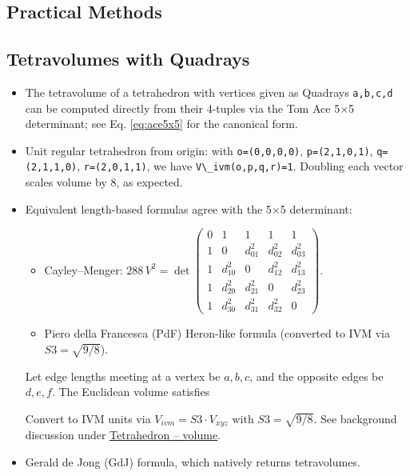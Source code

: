 \documentclass[
  10pt,
]{article}
\newcommand{\passthrough}[1]{#1}
\providecommand{\tightlist}{%
  \setlength{\itemsep}{0pt}\setlength{\parskip}{0pt}}
\begin{document}
\hypertarget{practical-methods}{%
\subsection{Practical Methods}\label{practical-methods}}

\hypertarget{sec:tetravolumes_quadrays}{%
\subsection{Tetravolumes with
Quadrays}\label{sec:tetravolumes_quadrays}}

\begin{itemize}
\item
  The tetravolume of a tetrahedron with vertices given as Quadrays
  \passthrough{\lstinline!a,b,c,d!} can be computed directly from their
  4-tuples via the Tom Ace 5×5 determinant; see Eq. \eqref{eq:ace5x5}
  for the canonical form.
\item
  Unit regular tetrahedron from origin: with
  \passthrough{\lstinline!o=(0,0,0,0)!},
  \passthrough{\lstinline!p=(2,1,0,1)!},
  \passthrough{\lstinline!q=(2,1,1,0)!},
  \passthrough{\lstinline!r=(2,0,1,1)!}, we have
  \passthrough{\lstinline!V\_ivm(o,p,q,r)=1!}. Doubling each vector
  scales volume by 8, as expected.
\item
  Equivalent length-based formulas agree with the 5×5 determinant:

  \begin{itemize}
  \tightlist
  \item
    Cayley--Menger:
    \(288\,V^2 = \det\begin{pmatrix}0&1&1&1&1\\1&0&d_{01}^2&d_{02}^2&d_{03}^2\\1&d_{10}^2&0&d_{12}^2&d_{13}^2\\1&d_{20}^2&d_{21}^2&0&d_{23}^2\\1&d_{30}^2&d_{31}^2&d_{32}^2&0\end{pmatrix}\).
  \item
    Piero della Francesca (PdF) Heron-like formula (converted to IVM via
    \(S3 = \sqrt{9/8}\)).
  \end{itemize}

  Let edge lengths meeting at a vertex be \(a,b,c\), and the opposite
  edges be \(d,e,f\). The Euclidean volume satisfies

  Convert to IVM units via \(V_{ivm} = S3 \cdot V_{xyz}\) with
  \(S3=\sqrt{9/8}\). See background discussion under
  \href{https://en.wikipedia.org/wiki/Tetrahedron\#Volume}{Tetrahedron
  -- volume}.
\item
  Gerald de Jong (GdJ) formula, which natively returns tetravolumes.


\end{itemize}
\end{document}
